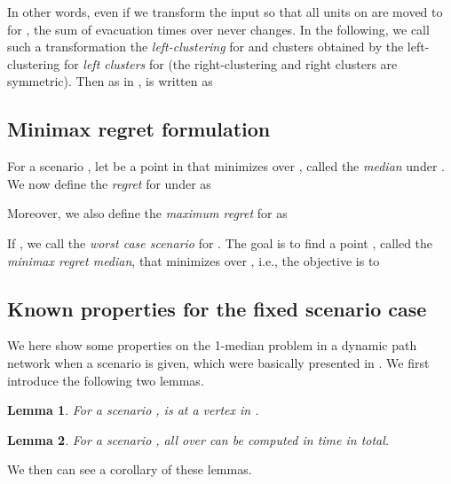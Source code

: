 \documentclass[a4paper]{llncs}
\newtheorem{lem}{Lemma}
\begin{document}
In other words, even if we transform the input so that all units on  are moved to  for ,
the sum of evacuation times over  never changes.
In the following, we call such a transformation the {\it left-clustering} for  and
clusters obtained by the left-clustering for  {\it left clusters} for 
(the right-clustering and right clusters are symmetric).
Then as in \cite{hgk14_2,hgk14_4},  is written as 










\subsection{Minimax regret formulation}
\label{subsec:mi}
For a scenario , let  be a point in  that minimizes  over , called the {\it median} under . 
We now define the {\it regret} for  under  as

Moreover, we also define the {\it maximum regret} for  as

If , 
we call  the {\it worst case scenario} for .
The goal is to find a point , called the {\it minimax regret median}, that minimizes  over ,
i.e., the objective is to





\subsection{Known properties for the fixed scenario case}
\label{subsec:kp}
We here show some properties on the 1-median problem in a dynamic path network  when a scenario  is given, which were basically presented in \cite{hgk14_2,hgk14_4}.
We first introduce the following two lemmas.


\begin{lem}
For a scenario ,  is at a vertex in .
\label{lem:ms}
\end{lem}



\begin{lem}
For a scenario , all  over  can be computed in  time in total.
\label{lem:pht}
\end{lem}


\noindent
We then can see a corollary of these lemmas.
\end{document}
